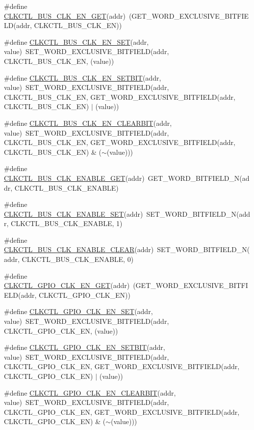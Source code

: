 \begin{DoxyCompactItemize}
\#define \hyperlink{a00544_abd1a1dbdab9cc7a2c08cdae0fb060d1e}{CLKCTL\_\-BUS\_\-CLK\_\-EN\_\-GET}(addr)~(GET\_\-WORD\_\-EXCLUSIVE\_\-BITFIELD(addr, CLKCTL\_\-BUS\_\-CLK\_\-EN))
\item 
\#define \hyperlink{a00544_a0d8dda7c2c625f08e0cb4e9e8e34a70e}{CLKCTL\_\-BUS\_\-CLK\_\-EN\_\-SET}(addr, value)~SET\_\-WORD\_\-EXCLUSIVE\_\-BITFIELD(addr, CLKCTL\_\-BUS\_\-CLK\_\-EN, (value))
\item 
\#define \hyperlink{a00544_a797b8023944a53d3e9b8d56569029eeb}{CLKCTL\_\-BUS\_\-CLK\_\-EN\_\-SETBIT}(addr, value)~SET\_\-WORD\_\-EXCLUSIVE\_\-BITFIELD(addr, CLKCTL\_\-BUS\_\-CLK\_\-EN, GET\_\-WORD\_\-EXCLUSIVE\_\-BITFIELD(addr, CLKCTL\_\-BUS\_\-CLK\_\-EN) $|$ (value))
\item 
\#define \hyperlink{a00544_aace669e42b186cb064c30ed5c67517c2}{CLKCTL\_\-BUS\_\-CLK\_\-EN\_\-CLEARBIT}(addr, value)~SET\_\-WORD\_\-EXCLUSIVE\_\-BITFIELD(addr, CLKCTL\_\-BUS\_\-CLK\_\-EN, GET\_\-WORD\_\-EXCLUSIVE\_\-BITFIELD(addr, CLKCTL\_\-BUS\_\-CLK\_\-EN) \& ($\sim$(value)))
\item 
\#define \hyperlink{a00544_a14edd091c69c42e60bd5339130227416}{CLKCTL\_\-BUS\_\-CLK\_\-ENABLE\_\-GET}(addr)~GET\_\-WORD\_\-BITFIELD\_\-N(addr, CLKCTL\_\-BUS\_\-CLK\_\-ENABLE)
\item 
\#define \hyperlink{a00544_a7aedb6e1eccf9fce32746d8e922e2ed3}{CLKCTL\_\-BUS\_\-CLK\_\-ENABLE\_\-SET}(addr)~SET\_\-WORD\_\-BITFIELD\_\-N(addr, CLKCTL\_\-BUS\_\-CLK\_\-ENABLE, 1)
\item 
\#define \hyperlink{a00544_a840cb186c537295b073457e60a128fe7}{CLKCTL\_\-BUS\_\-CLK\_\-ENABLE\_\-CLEAR}(addr)~SET\_\-WORD\_\-BITFIELD\_\-N(addr, CLKCTL\_\-BUS\_\-CLK\_\-ENABLE, 0)
\item 
\#define \hyperlink{a00544_a77a40411a401c5d8739665fca732599a}{CLKCTL\_\-GPIO\_\-CLK\_\-EN\_\-GET}(addr)~(GET\_\-WORD\_\-EXCLUSIVE\_\-BITFIELD(addr, CLKCTL\_\-GPIO\_\-CLK\_\-EN))
\item 
\#define \hyperlink{a00544_a9a637742a6e5387b5a0992410c1707b0}{CLKCTL\_\-GPIO\_\-CLK\_\-EN\_\-SET}(addr, value)~SET\_\-WORD\_\-EXCLUSIVE\_\-BITFIELD(addr, CLKCTL\_\-GPIO\_\-CLK\_\-EN, (value))
\item 
\#define \hyperlink{a00544_a56548c6b4590c39fd8d13739bca9714b}{CLKCTL\_\-GPIO\_\-CLK\_\-EN\_\-SETBIT}(addr, value)~SET\_\-WORD\_\-EXCLUSIVE\_\-BITFIELD(addr, CLKCTL\_\-GPIO\_\-CLK\_\-EN, GET\_\-WORD\_\-EXCLUSIVE\_\-BITFIELD(addr, CLKCTL\_\-GPIO\_\-CLK\_\-EN) $|$ (value))
\item 
\#define \hyperlink{a00544_a52c228a420649b975ec8059808ebae61}{CLKCTL\_\-GPIO\_\-CLK\_\-EN\_\-CLEARBIT}(addr, value)~SET\_\-WORD\_\-EXCLUSIVE\_\-BITFIELD(addr, CLKCTL\_\-GPIO\_\-CLK\_\-EN, GET\_\-WORD\_\-EXCLUSIVE\_\-BITFIELD(addr, CLKCTL\_\-GPIO\_\-CLK\_\-EN) \& ($\sim$(value)))

\end{DoxyCompactItemize}
